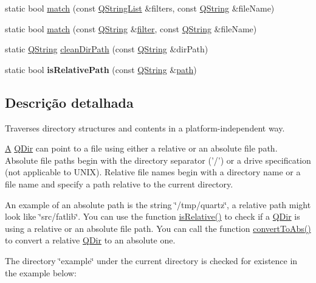 \begin{DoxyCompactItemize}
\item 
static bool \hyperlink{class_q_dir_addb572de5a0147501ad71f705c2f0e2b}{match} (const \hyperlink{class_q_string_list}{Q\-String\-List} \&filters, const \hyperlink{class_q_string}{Q\-String} \&file\-Name)
\item 
static bool \hyperlink{class_q_dir_a9b5e9a0892e4534776c6091c72a2e4a3}{match} (const \hyperlink{class_q_string}{Q\-String} \&\hyperlink{class_q_dir_a1087ca52300e3a6e4aa3af11f3e531d4}{filter}, const \hyperlink{class_q_string}{Q\-String} \&file\-Name)
\item 
static \hyperlink{class_q_string}{Q\-String} \hyperlink{class_q_dir_a72a4ae1acab673f29c2bcc3ac7fd0c00}{clean\-Dir\-Path} (const \hyperlink{class_q_string}{Q\-String} \&dir\-Path)
\item 
\hypertarget{class_q_dir_a0cbbd110fc47ce6e6d02efd2a35f928f}{static bool {\bfseries is\-Relative\-Path} (const \hyperlink{class_q_string}{Q\-String} \&\hyperlink{class_q_dir_abef507bc8e9b061531a77dc84e991255}{path})}\label{class_q_dir_a0cbbd110fc47ce6e6d02efd2a35f928f}

\end{DoxyCompactItemize}


\subsection{Descrição detalhada}
Traverses directory structures and contents in a platform-\/independent way. 

\hyperlink{class_a}{A} \hyperlink{class_q_dir}{Q\-Dir} can point to a file using either a relative or an absolute file path. Absolute file paths begin with the directory separator ('/') or a drive specification (not applicable to U\-N\-I\-X). Relative file names begin with a directory name or a file name and specify a path relative to the current directory.

An example of an absolute path is the string \char`\"{}/tmp/quartz\char`\"{}, a relative path might look like \char`\"{}src/fatlib\char`\"{}. You can use the function \hyperlink{class_q_dir_ad6802e0e235015f0503e36db60d819e8}{is\-Relative()} to check if a \hyperlink{class_q_dir}{Q\-Dir} is using a relative or an absolute file path. You can call the function \hyperlink{class_q_dir_a92c71858159be3400795711ad6d8f584}{convert\-To\-Abs()} to convert a relative \hyperlink{class_q_dir}{Q\-Dir} to an absolute one.

The directory \char`\"{}example\char`\"{} under the current directory is checked for existence in the example below\-:


